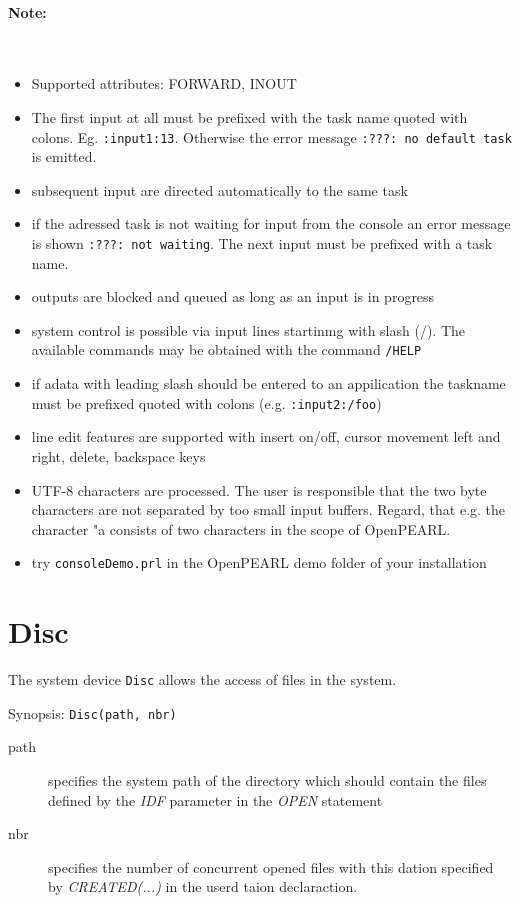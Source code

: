 \paragraph{Note:}\ 
\begin{itemize}
\item Supported attributes: FORWARD, INOUT
\item The first input at all must be prefixed with the task name
 quoted with colons. Eg. \verb|:input1:13|. Otherwise the error message
 \verb|:???: no default task| is emitted.
\item subsequent input are directed automatically to the same task
\item if the adressed task is not waiting for input from the console an
  error message is shown \verb|:???: not waiting|. The next input must be 
  prefixed with a task name.
\item outputs are blocked and queued as long as an input is in progress
\item system control is possible via input lines startinmg with slash (/).
  The available commands may be obtained with the command \verb|/HELP|
\item if adata with leading slash should  be entered to an appilication
   the taskname must be prefixed quoted with colons (e.g. \verb|:input2:/foo|)
\item line edit features are supported with 
   insert on/off, cursor movement left and right, delete, backspace keys
\item UTF-8 characters are processed. The user is responsible that 
   the two byte characters are not separated by too small input buffers.
   Regard, that e.g. the character "a consists of  two characters in the 
   scope of OpenPEARL.
\item try \verb|consoleDemo.prl|  in the OpenPEARL demo folder of your installation
\end{itemize}

\section{Disc}
The system device \verb|Disc| allows the access of files in the system.

Synopsis: \verb|Disc(path, nbr)|

\begin{description}
\item [path] specifies the system path of the directory which should contain
    the files defined by the {\em IDF} parameter in the {\em OPEN} statement
\item[nbr] specifies the number of concurrent opened files with this dation
     specified by {\em CREATED(...)} in the userd taion declaraction.
\end{description}

